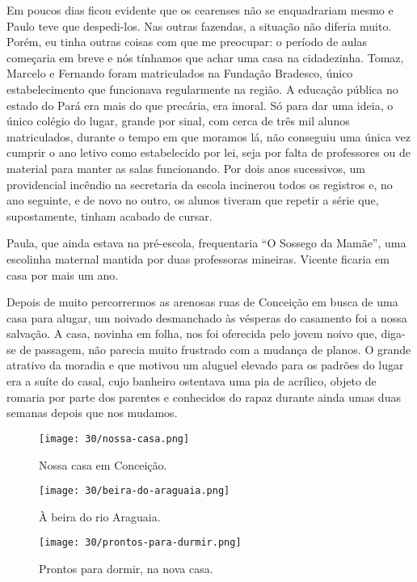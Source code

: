 Em poucos dias ficou evidente que os cearenses não se enquadrariam mesmo e Paulo teve que despedi-los.
Nas outras fazendas, a situação não diferia muito.
Porém, eu tinha outras coisas com que me preocupar: o período de aulas começaria em breve e nós tínhamos que achar uma casa na cidadezinha.
Tomaz, Marcelo e Fernando foram matriculados na Fundação Bradesco, único estabelecimento que funcionava regularmente na região.
A educação pública no estado do Pará era mais do que precária, era imoral.
Só para dar uma ideia, o único colégio do lugar, grande por sinal, com cerca de três mil alunos matriculados, durante o tempo em que moramos lá, não conseguiu uma única vez cumprir o ano letivo como estabelecido por lei, seja por falta de professores ou de material para manter as salas funcionando.
Por dois anos sucessivos, um providencial incêndio na secretaria da escola incinerou todos os registros e, no ano seguinte, e de novo no outro, os alunos tiveram que repetir a série que, supostamente, tinham acabado de cursar.

Paula, que ainda estava na pré-escola, frequentaria ``O Sossego da Mamãe'', uma escolinha maternal mantida por duas professoras mineiras.
Vicente ficaria em casa por mais um ano.

Depois de muito percorrermos as arenosas ruas de Conceição em busca de uma casa para alugar, um noivado desmanchado às vésperas do casamento foi a nossa salvação.
A casa, novinha em folha, nos foi oferecida pelo jovem noivo que, diga-se de passagem, não parecia muito frustrado com a mudança de planos.
O grande atrativo da moradia e que motivou um aluguel elevado para os padrões do lugar era a suíte do casal, cujo banheiro ostentava uma pia de acrílico, objeto de romaria por parte dos parentes e conhecidos do rapaz durante ainda umas duas semanas depois que nos mudamos.

\begin{figure}
\centering
\texttt{[image: 30/nossa-casa.png]}
\caption{Nossa casa em Conceição.}
\end{figure}

\begin{figure}
\centering
\texttt{[image: 30/beira-do-araguaia.png]}
\caption{À beira do rio Araguaia.}
\end{figure}

\begin{figure}
\centering
\texttt{[image: 30/prontos-para-durmir.png]}
\caption{Prontos para dormir, na nova casa.}
\end{figure}

